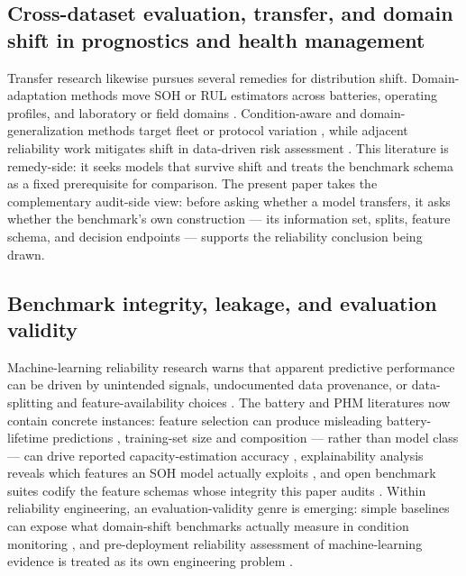 \documentclass[
  number,
  preprint]{elsarticle}
\begin{document}
\subsection{Cross-dataset evaluation, transfer, and domain shift in
prognostics and health
management}\label{cross-dataset-evaluation-transfer-and-domain-shift-in-prognostics-and-health-management}

Transfer research likewise pursues several remedies for distribution
shift. Domain-adaptation methods move SOH or RUL estimators across
batteries, operating profiles, and laboratory or field domains
\citep{ye2021domainadversarial, vilsen2022field, shen2024review, nejjar2024domain, nejjar2026uncertaintyguided, wang2026twostage}.
Condition-aware and domain-generalization methods target fleet or
protocol variation \citep{zhang2023multitask, fei2026decoupled}, while
adjacent reliability work mitigates shift in data-driven risk assessment
\citep{wang2025mitigating}. This literature is remedy-side: it seeks
models that survive shift and treats the benchmark schema as a fixed
prerequisite for comparison. The present paper takes the complementary
audit-side view: before asking whether a model transfers, it asks
whether the benchmark's own construction --- its information set,
splits, feature schema, and decision endpoints --- supports the
reliability conclusion being drawn.

\subsection{Benchmark integrity, leakage, and evaluation
validity}\label{benchmark-integrity-leakage-and-evaluation-validity}

Machine-learning reliability research warns that apparent predictive
performance can be driven by unintended signals, undocumented data
provenance, or data-splitting and feature-availability choices
\citep{gebru2021datasheets, geirhos2020shortcut, kapoor2023leakage}. The
battery and PHM literatures now contain concrete instances: feature
selection can produce misleading battery-lifetime predictions
\citep{geslin2023selecting}, training-set size and composition ---
rather than model class --- can drive reported capacity-estimation
accuracy \citep{nagulapati2021capacity}, explainability analysis reveals
which features an SOH model actually exploits
\citep{wang2023explainabilitydriven}, and open benchmark suites codify
the feature schemas whose integrity this paper audits
\citep{wang2024open}. Within reliability engineering, an
evaluation-validity genre is emerging: simple baselines can expose what
domain-shift benchmarks actually measure in condition monitoring
\citep{panic2027simple}, and pre-deployment reliability assessment of
machine-learning evidence is treated as its own engineering problem
\citep{chen2024evaluating}.
\end{document}
